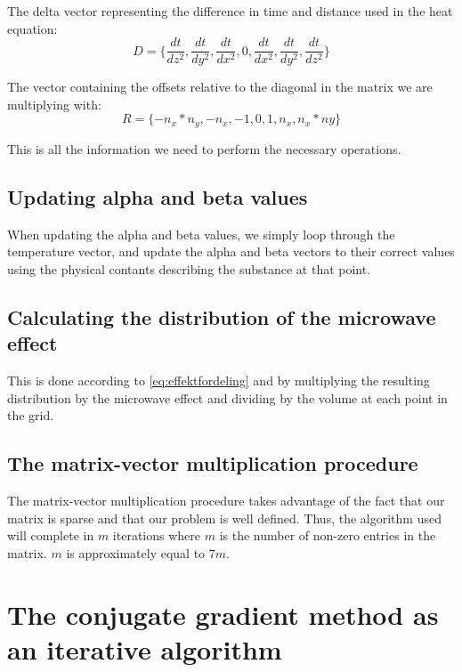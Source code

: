 The delta vector representing the difference in time and distance used in the heat
equation:
\begin{equation}
D = \{ \frac{dt}{dz^2}, \frac{dt}{dy^2}, \frac{dt}{dx^2}, 0, \frac{dt}{dx^2}, \frac{dt}{dy^2}, \frac{dt}{dz^2} \}
\end{equation}

The vector containing the offsets relative to the diagonal in the matrix we are multiplying
with:
\begin{equation}
R = \{ -n_x*n_y, -n_x, -1, 0, 1, n_x, n_x*ny \}
\end{equation}

This is all the information we need to perform the necessary operations.

\subsection{Updating alpha and beta values}

When updating the alpha and beta values, we simply loop through the temperature
vector, and update the alpha and beta vectors to their correct values using the
physical contants describing the substance at that point.

\subsection{Calculating the distribution of the microwave effect}

This is done according to \cref{eq:effektfordeling} and by multiplying the
resulting distribution by the microwave effect and dividing by the volume at each point
in the grid.

\subsection{The matrix-vector multiplication procedure}

The matrix-vector multiplication procedure takes advantage of the fact that our 
matrix is sparse and that our problem is well defined. Thus, the algorithm used
will complete in $m$ iterations where $m$ is the number of non-zero entries in 
the matrix. $m$ is approximately equal to $7m$.

\section{The conjugate gradient method as an iterative algorithm}

